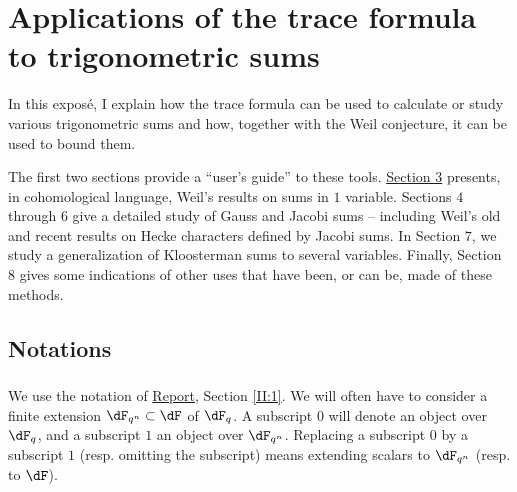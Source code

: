 
\chapter{Applications of the trace formula to trigonometric sums}\label{VI}










In this exposé, I explain how the trace formula can be used to calculate 
or study various trigonometric sums and how, together with the 
Weil conjecture, it can be used to bound them.

The first two sections provide a ``user's guide'' to these tools. 
\hyperref[VI:3]{Section 3} presents, in cohomological language, Weil's results on sums in 
$1$ variable. Sections $4$ through $6$ give a 
detailed study of Gauss and Jacobi sums -- including 
Weil's old and recent results on Hecke characters 
defined by Jacobi sums. In Section $7$, we study a 
generalization of Kloosterman sums to several variables. Finally, 
Section $8$ gives some indications of other uses that have been, or can be, 
made of these methods. 










\section*{Notations}\label{VI:0}





\subsection{}\label{VI:0-1}

We use the notation of \hyperref[II]{Report}, Section \ref{II:1}. We 
will often have to consider a finite extension $\dF_{q^n}\subset \dF$ of 
$\dF_q$. A subscript $0$ will denote an object over $\dF_q$, and a subscript $1$ 
an object over $\dF_{q^n}$. Replacing a subscript $0$ by a subscript $1$ (resp. 
omitting the subscript) means extending scalars to $\dF_{q^n}$ (resp. 
to $\dF$).





\subsection{}\label{VI:0-2}

